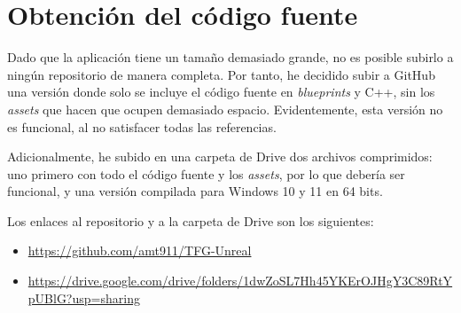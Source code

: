 \chapter{Obtención del código fuente}

Dado que la aplicación tiene un tamaño demasiado grande, no es posible subirlo a ningún repositorio de manera completa. Por tanto, he decidido subir a GitHub una versión donde solo se incluye el código fuente en \textit{blueprints} y C++, sin los \textit{assets} que hacen que ocupen demasiado espacio. Evidentemente, esta versión no es funcional, al no satisfacer todas las referencias.

\bigskip

Adicionalmente, he subido en una carpeta de Drive dos archivos comprimidos: uno primero con todo el código fuente y los \textit{assets}, por lo que debería ser funcional, y una versión compilada para Windows 10 y 11 en 64 bits.

\bigskip

Los enlaces al repositorio y a la carpeta de Drive son los siguientes:

\begin{itemize}
    \item \url{https://github.com/amt911/TFG-Unreal}
    \item \url{https://drive.google.com/drive/folders/1dwZoSL7Hh45YKErOJHgY3C89RtYpUBlG?usp=sharing}
\end{itemize}